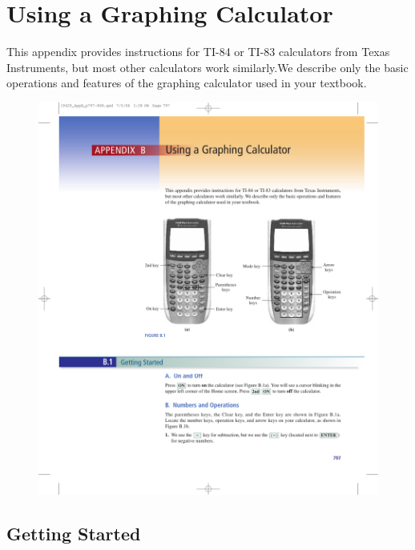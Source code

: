 \documentclass[10pt,]{book}
\theoremstyle{plain}
\theoremstyle{definition}
\theoremstyle{definition}
\theoremstyle{definition}
\numberwithin{equation}{part}
\begin{document}
\chapter[{Using a Graphing Calculator}]{Using a Graphing Calculator}\label{appendix-b}
\typeout{************************************************}
\typeout{************************************************}
This appendix provides instructions for TI-84 or TI-83 calculators from Texas Instruments, but most other calculators work similarly.We describe only the basic operations and features of the graphing calculator used in your textbook. \leavevmode%
\begin{figure}
\centering
\includegraphics[width=1\linewidth]{images/fig-TI-84}
\caption{\label{fig-TI-84}}
\end{figure}
%
\typeout{************************************************}
\typeout{************************************************}
\section[{Getting Started}]{Getting Started}\label{appendix-Getting-Started}
\typeout{************************************************}
\typeout{************************************************}
\end{document}

